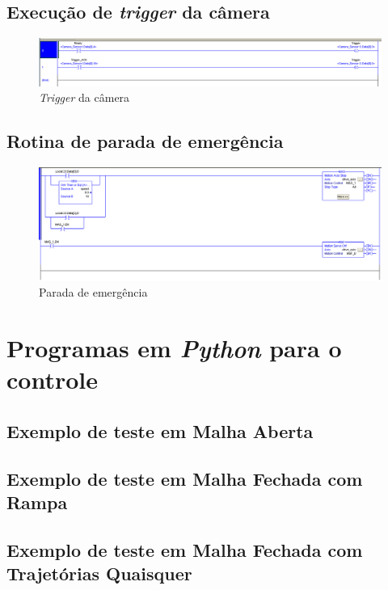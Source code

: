 \subsection{Execução de \textit{trigger} da câmera}
\label{laddertrigger}
\begin{figure}[!ht]
\centering
\includegraphics[width=\linewidth]{figs/ladder/camera_trigger}
\caption{\textit{Trigger} da câmera}
\end{figure}

\subsection{Rotina de parada de emergência}
\label{emergencyladder}
\begin{figure}[!ht]
\centering
\includegraphics[width=\linewidth]{figs/ladder/emergency}
\caption{Parada de emergência}
\end{figure}

\section{Programas em \textit{Python} para o controle}
\subsection{Exemplo de teste em Malha Aberta}
\label{malhaAbertaAnexo}


\subsection{Exemplo de teste em Malha Fechada com Rampa}
\label{malhaFechadaRampaAnexo}


\subsection{Exemplo de teste em Malha Fechada com Trajetórias Quaisquer}
\label{betterSmithAnexo}


